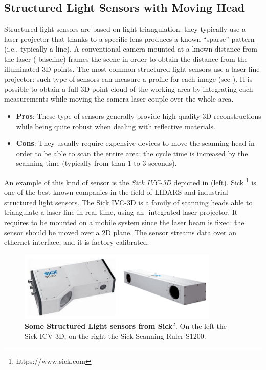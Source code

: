 \subsection{Structured Light Sensors with Moving Head}\label{subsec:sl_sensors_mh}
Structured light sensors are based on light triangulation: they typically use a laser projector that thanks to a specific lens produces a known ``sparse'' pattern (i.e., typically a line). A conventional camera mounted at a known distance from the laser (​ baseline) frames the scene in order to obtain the distance from the illuminated 3D points. The most common structured light sensors use a laser line projector: such type of sensors can measure a profile for each image (see ). It is possible to obtain a full 3D point cloud of the working area by integrating each measurements while moving the camera-laser couple over the whole area.

\begin{itemize}
	\item \textbf{Pros}: These type of sensors generally provide high quality 3D reconstructions while being quite robust when dealing with reflective materials.
	\item \textbf{Cons}: They usually require expensive devices to move the scanning head in order to be able to scan the entire area; the cycle time is increased by the scanning time (typically from than 1 to 3 seconds).
\end{itemize}

An example of this kind of sensor is the \emph{Sick IVC-3D} depicted in  (left). Sick ​\footnote{https://www.sick.com} is one of the best known companies in the field of LIDARS and industrial structured light sensors. The Sick IVC-3D is a family of scanning heads able to triangulate a laser line in real-time, using an ​ integrated laser projector. It requires to be mounted on a mobile system since the laser beam is fixed: the sensor should be moved over a 2D plane. The sensor streams data over an ethernet interface, and it is factory calibrated.

\begin{figure}
    \centering
    \includegraphics[width=0.85\textwidth]{figures/1_perception_and_sensing_in_robotics/sic_sensor}
    \caption{\textbf{Some Structured Light sensors from Sick$^2$}. On the left the Sick ICV-3D, on the right the Sick Scanning Ruler S1200.} 
    \label{fig:sic_sensor}
\end{figure}

